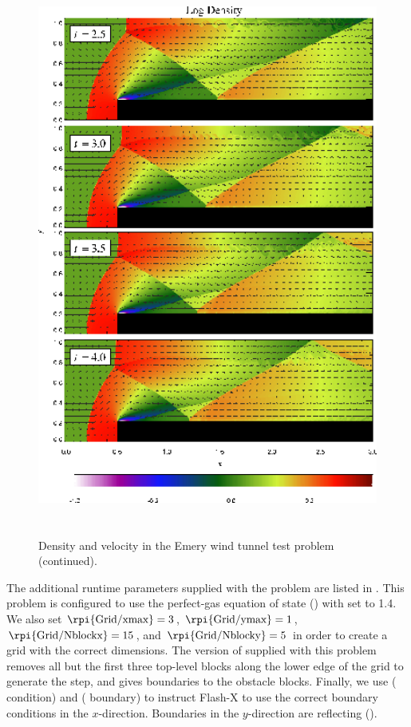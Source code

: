 \begin{figure}
\begin{center}
{\leavevmode\includegraphics[height=7in]{WindTunnel_b}}
\end{center}
\addtocounter{figure}{-1}
\caption{\label{Fig:Wind tunnel (contd)} Density and velocity in the Emery
wind tunnel test problem (continued).
}
\end{figure}

The additional runtime parameters supplied with the
 problem are listed in . 
This problem is configured to use the perfect-gas
equation of state () with  set to 1.4. We
also set $\mbox{\rpi{Grid/xmax}}=3$, $\mbox{\rpi{Grid/ymax}}=1$, 
$\mbox{\rpi{Grid/Nblockx}}=15$, and
$\mbox{\rpi{Grid/Nblocky}}=5$ in order to create a grid with the correct
dimensions. The version of  supplied with this
problem 
removes all but the first three top-level blocks along the lower edge
of the grid to generate the step, and 
gives  boundaries to the obstacle blocks. 
Finally, we
use   ( condition) and
  ( boundary) to instruct Flash-X to use
the correct boundary conditions in the $x$-direction. Boundaries in
the $y$-direction are reflecting ().

